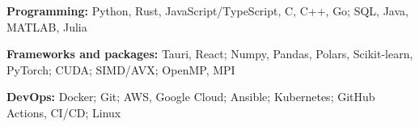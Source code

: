 \begin{enumerate}[label={[\arabic*]},nosep]
  \item \textbf{Programming:} Python, Rust, JavaScript/TypeScript, C, C++, Go; SQL, Java, MATLAB, Julia
  \item \textbf{Frameworks and packages:} Tauri, React; Numpy, Pandas, Polars, Scikit-learn, PyTorch; CUDA; SIMD/AVX; OpenMP, MPI
  \item \textbf{DevOps:} Docker; Git; AWS, Google Cloud; Ansible; Kubernetes; GitHub Actions, CI/CD; Linux
\end{enumerate}
